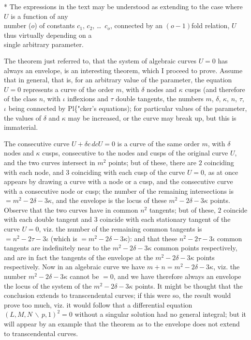 \documentclass[11pt,a4paper]{book}
\begin{document}
\begin{flushright}
* The expressions in the text may be understood as extending to the case where $U$ is a function of any\\
number ($o$) of constants $c_1$, $c_2$, \ldots\ $c_o$, connected by an $(o-1)$fold relation, $U$ thus virtually depending on a\\
single arbitrary parameter.
\end{flushright}

The theorem just referred to, that the system of algebraic curves $U = 0$ has always an envelope, is an interesting theorem, which I proceed to prove. Assume that in general, that is, for an arbitrary value of the parameter, the equation $U = 0$ represents a curve of the order $m$, with $\delta$ nodes and $\kappa$ cusps (and therefore of the class $n$, with $\iota$ inflexions and $\tau$ double tangents, the numbers $m$, $\delta$, $\kappa$, $n$, $\tau$, $\iota$ being connected by Pl\{"cker's equations); for particular values of the parameter, the values of $\delta$ and $\kappa$ may be increased, or the curve may break up, but this is immaterial.

The consecutive curve $U + \delta c\, dc U = 0$ is a curve of the same order $m$, with $\delta$ nodes and $\kappa$ cusps, consecutive to the nodes and cusps of the original curve $U$, and the two curves intersect in $m^2$ points; but of these, there are $2$ coinciding with each node, and $3$ coinciding with each cusp of the curve $U = 0$, as at once appears by drawing a curve with a node or a cusp, and the consecutive curve with a consecutive node or cusp; the number of the remaining intersections is $= m^2 - 2\delta - 3\kappa$, and the envelope is the locus of these $m^2 - 2\delta - 3\kappa$ points. Observe that the two curves have in common $n^2$ tangents; but of these, $2$ coincide with each double tangent and $3$ coincide with each stationary tangent of the curve $U = 0$, viz. the number of the remaining common tangents is $= n^2 - 2\tau - 3\iota$ (which is $= m^2 - 2\delta - 3\kappa$): and that these $n^2 - 2\tau - 3\iota$ common tangents are indefinitely near to the $m^2 - 2\delta - 3\kappa$ common points respectively, and are in fact the tangents of the envelope at the $m^2 - 2\delta - 3\kappa$ points respectively. Now in an algebraic curve we have $m + n = m^2 - 2\delta - 3\kappa$, viz. the number $m^2 - 2\delta - 3\kappa$ cannot be $=0$, and we have therefore always an envelope the locus of the system of the $m^2 - 2\delta - 3\kappa$ points. It might be thought that the conclusion extends to transcendental curves; if this were so, the result would prove too much, viz. it would follow that a differential equation $(L, M, N \,\backslash\, p, 1)^2 = 0$ without a singular solution had no general integral; but it will appear by an example that the theorem as to the envelope does not extend to transcendental curves.
\end{document}
